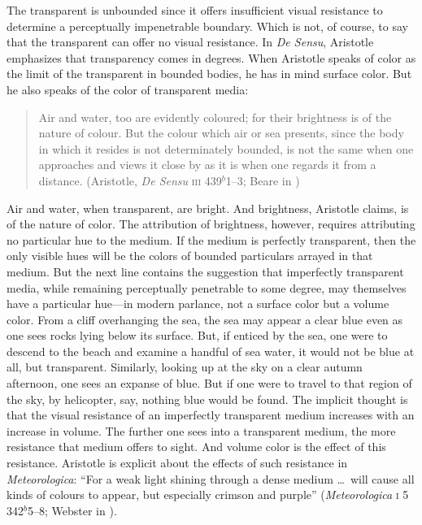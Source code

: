 The transparent is unbounded since it offers insufficient visual resistance to determine a perceptually impenetrable boundary. Which is not, of course, to say that the transparent can offer no visual resistance. In \emph{De Sensu}, Aristotle emphasizes that transparency comes in degrees. When Aristotle speaks of color as the limit of the transparent in bounded bodies, he has in mind surface color. But he also speaks of the color of transparent media:
\begin{quote}
    Air and water, too are evidently coloured; for their brightness is of the nature of colour. But the colour which air or sea presents, since the body in which it resides is not determinately bounded, is not the same when one approaches and views it close by as it is when one regards it from a distance. (Aristotle, \emph{De Sensu} \textsc{iii} 439\( ^{b} \)1--3; Beare in \citealt[7]{Barnes:1984uq})
\end{quote}
Air and water, when transparent, are bright. And brightness, Aristotle claims, is of the nature of color. The attribution of brightness, however, requires attributing no particular hue to the medium. If the medium is perfectly transparent, then the only visible hues will be the colors of bounded particulars arrayed in that medium. But the next line contains the suggestion that imperfectly transparent media, while remaining perceptually penetrable to some degree, may themselves have a particular hue---in modern parlance, not a surface color but a volume color. From a cliff overhanging the sea, the sea may appear a clear blue even as one sees rocks lying below its surface. But, if enticed by the sea, one were to descend to the beach and examine a handful of sea water, it would not be blue at all, but transparent. Similarly, looking up at the sky on a clear autumn afternoon, one sees an expanse of blue. But if one were to travel to that region of the sky, by helicopter, say, nothing blue would be found. The implicit thought is that the visual resistance of an imperfectly transparent medium increases with an increase in volume. The further one sees into a transparent medium, the more resistance that medium offers to sight. And volume color is the effect of this resistance. Aristotle is explicit about the effects of such resistance in \emph{Meteorologica}: ``For a weak light shining through a dense medium \ldots\ will cause all kinds of colours to appear, but especially crimson and purple'' (\emph{Meteorologica} \textsc{i} 5 342\( ^{b} \)5--8; Webster in \citealt[8--9]{Barnes:1984uq}).

